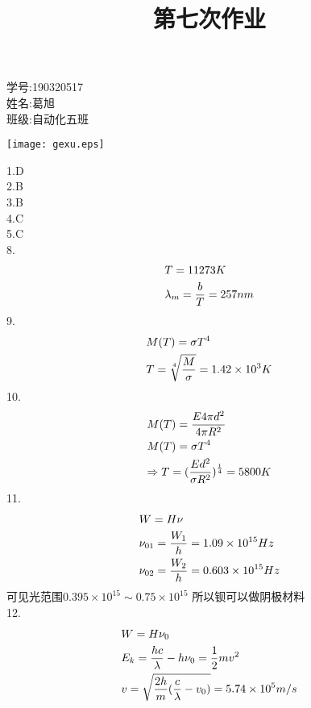 \documentclass{article}
\begin{document}
\title{第七次作业}
\maketitle
\begin{minipage}[b]{0.5\linewidth}
学号:190320517\\
姓名:葛旭\\
班级:自动化五班\\
\end{minipage}
\hfill
\begin{minipage}[b]{0.5\linewidth}
\texttt{[image: gexu.eps]}\\
\end{minipage}
1.D\\
2.B\\
3.B\\
4.C\\
5.C\\
8.\[\begin{gathered}
T = 11273K \hfill \\
{\lambda _m} = \frac{b}{T} = 257nm \hfill \\ 
\end{gathered} \]
9.\[\begin{gathered}
M(T) = \sigma {T^4} \hfill \\
T = \sqrt[4]{{\frac{M}{\sigma }}} = 1.42 \times {10^3}K \hfill \\ 
\end{gathered} \]
10.\[\begin{gathered}
M(T) = \frac{{E4\pi {d^2}}}{{4\pi {R^2}}} \hfill \\
M(T) = \sigma {T^4} \hfill \\
\Rightarrow T = {(\frac{{E{d^2}}}{{\sigma {R^2}}})^{\frac{1}{4}}} = 5800K \hfill \\ 
\end{gathered} \]
11.\[\begin{gathered}
W = H\nu  \hfill \\
{\nu _{01}} = \frac{{{W_1}}}{h} = 1.09 \times {10^{15}}Hz \hfill \\
{\nu _{02}} = \frac{{{W_2}}}{h} = 0.603 \times {10^{15}}Hz \hfill \\ 
\end{gathered} \]
可见光范围$0.395\times {10^{15}} \sim 0.75\times {10^{15}}$
所以钡可以做阴极材料\\
12.\[\begin{gathered}
W = H{\nu _{\text{0}}} \hfill \\
{E_k} = \frac{{hc}}{\lambda } - h{\nu _0} = \frac{1}{2}m{v^2} \hfill \\
v = \sqrt {\frac{{2h}}{m}(\frac{c}{\lambda } - {v_0})}  = 5.74 \times {10^5}m/s \hfill \\ 
\end{gathered} \]
\end{document}
